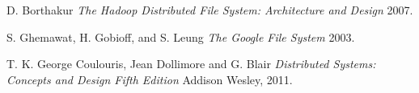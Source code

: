 \documentclass[times, 10pt,twocolumn]{article}
\begin{document}





\begin{thebibliography}{1}

   D. Borthakur {\em The Hadoop Distributed File System: Architecture and Design}  2007.

    S. Ghemawat, H. Gobioff, and S. Leung {\em The Google File System} 2003.

   T. K. George Coulouris, Jean Dollimore and G. Blair {\em Distributed Systems: Concepts and Design Fifth Edition} Addison Wesley, 2011.

\end{thebibliography}
\end{document}
